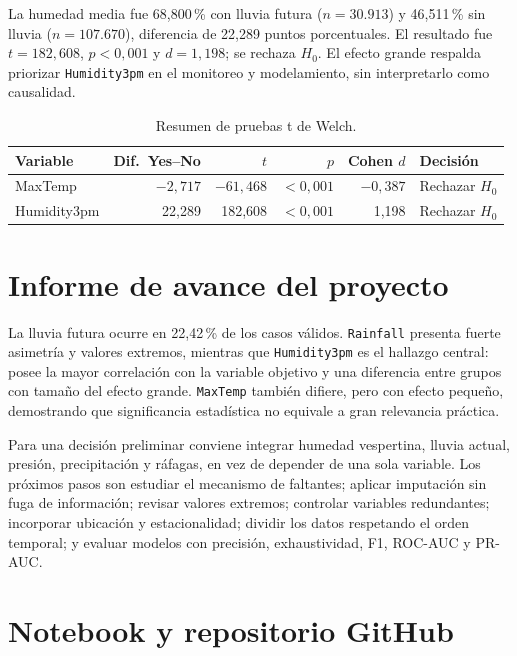 \documentclass[11pt,a4paper]{article}
\begin{document}
La humedad media fue 68,800\,\% con lluvia futura ($n=30.913$) y 46,511\,\% sin lluvia ($n=107.670$), diferencia de 22,289 puntos porcentuales. El resultado fue $t=182,608$, $p<0,001$ y $d=1,198$; se rechaza $H_0$. El efecto grande respalda priorizar \texttt{Humidity3pm} en el monitoreo y modelamiento, sin interpretarlo como causalidad.

\begin{table}[H]
\centering
\small
\caption{Resumen de pruebas t de Welch.}
\label{tab:pruebas}
\begin{tabular}{lrrrrl}
\toprule
Variable & Dif.\ Yes--No & $t$ & $p$ & Cohen $d$ & Decisión \\
\midrule
MaxTemp & $-2,717$ & $-61,468$ & $<0,001$ & $-0,387$ & Rechazar $H_0$ \\
Humidity3pm & 22,289 & 182,608 & $<0,001$ & 1,198 & Rechazar $H_0$ \\
\bottomrule
\end{tabular}
\end{table}

\section{Informe de avance del proyecto}

La lluvia futura ocurre en 22,42\,\% de los casos válidos. \texttt{Rainfall} presenta fuerte asimetría y valores extremos, mientras que \texttt{Humidity3pm} es el hallazgo central: posee la mayor correlación con la variable objetivo y una diferencia entre grupos con tamaño del efecto grande. \texttt{MaxTemp} también difiere, pero con efecto pequeño, demostrando que significancia estadística no equivale a gran relevancia práctica.

Para una decisión preliminar conviene integrar humedad vespertina, lluvia actual, presión, precipitación y ráfagas, en vez de depender de una sola variable. Los próximos pasos son estudiar el mecanismo de faltantes; aplicar imputación sin fuga de información; revisar valores extremos; controlar variables redundantes; incorporar ubicación y estacionalidad; dividir los datos respetando el orden temporal; y evaluar modelos con precisión, exhaustividad, F1, ROC-AUC y PR-AUC.

\section{Notebook y repositorio GitHub}
\end{document}

